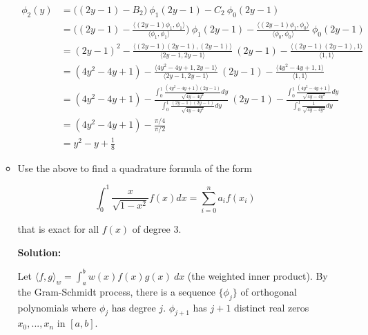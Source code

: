 \documentclass[a4paper,11pt]{report}
\begin{document}
\begin{enumerate}
\begin{itemize}
    \begin{equation*}
    \begin{aligned}
    \phi_{2}(y) &= \big((2y-1) - B_{2}\big)\ \phi_{1}(2y-1) - C_{2}\ \phi_{0}(2y-1) \\
                &= \bigg((2y-1) - \frac{\langle (2y-1) \phi_{1}, \phi_{1} \rangle}{\langle \phi_{1}, \phi_{1} \rangle}\bigg)\ \phi_{1}(2y-1) - \frac{\langle (2y-1) \phi_{1}, \phi_{0} \rangle}{\langle \phi_{0}, \phi_{0} \rangle}\ \phi_{0}(2y-1) \\
                &= (2y-1)^2 - \frac{\langle (2y-1)(2y-1), (2y-1) \rangle}{\langle 2y-1, 2y-1 \rangle}\ (2y-1) - \frac{\langle (2y-1)(2y-1), 1 \rangle}{\langle 1, 1 \rangle} \\
                &= (4y^2 - 4y + 1) - \frac{\langle 4y^2 - 4y + 1, 2y-1 \rangle}{\langle 2y-1, 2y-1 \rangle}\ (2y-1) - \frac{\langle 4y^2 - 4y + 1, 1 \rangle}{\langle 1, 1 \rangle} \\
                &= (4y^2 - 4y + 1) - \frac{\displaystyle \int_{0}^{1} \frac{(4y^2 - 4y + 1)(2y-1)}{\sqrt{4y-4y^2}} dy}{\displaystyle \int_{0}^{1} \frac{(2y-1)(2y-1)}{\sqrt{4y-4y^2}} dy}\ (2y-1) - \frac{\displaystyle \int_{0}^{1} \frac{(4y^2 - 4y + 1)}{\sqrt{4y-4y^2}} dy}{\displaystyle \int_{0}^{1} \frac{1}{\sqrt{4y-4y^2}} dy} \\
                &= (4y^2 - 4y + 1) - \displaystyle \frac{\pi/4}{\pi/2} \\
                &= y^2 - y + \frac{1}{8}
    \end{aligned}
    \end{equation*}
    
        \item Use the above to find a quadrature formula of the form

            \begin{equation*}
            \int_{0}^{1} \frac{x}{\sqrt{1 - x^{2}}} f(x) dx = \sum_{i=0}^{n} a_{i} f(x_{i})
            \end{equation*}

        that is exact for all $f(x)$ of degree $3$.

   \textbf{Solution:} 

    Let $\langle f, g \rangle_{w} = \displaystyle \int_{a}^{b} w(x) f(x) g(x)\ dx$ (the weighted inner product). By the Gram-Schmidt process, there is a sequence
    $\{\phi_{j}\}$ of orthogonal polynomials where $\phi_{j}$ has degree $j$. $\phi_{j+1}$ has $j+1$ distinct real zeros $x_{0}, ..., x_{n}$ in $[a, b]$. 


\end{itemize}
\end{enumerate}
\end{document}
